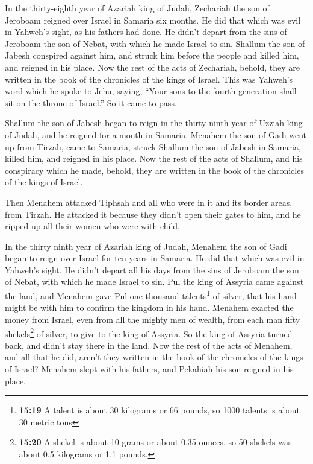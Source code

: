  In the thirty-eighth year of Azariah king of Judah,
Zechariah the son of Jeroboam reigned over Israel in Samaria six months.
 He did that which was evil in Yahweh's sight, as his
fathers had done. He didn't depart from the sins of Jeroboam the son of
Nebat, with which he made Israel to sin.  Shallum the son
of Jabesh conspired against him, and struck him before the people and
killed him, and reigned in his place.  Now the rest of
the acts of Zechariah, behold, they are written in the book of the
chronicles of the kings of Israel.  This was Yahweh's
word which he spoke to Jehu, saying, ``Your sons to the fourth
generation shall sit on the throne of Israel.'' So it came to pass.

 Shallum the son of Jabesh began to reign in the
thirty-ninth year of Uzziah king of Judah, and he reigned for a month in
Samaria.  Menahem the son of Gadi went up from Tirzah,
came to Samaria, struck Shallum the son of Jabesh in Samaria, killed
him, and reigned in his place.  Now the rest of the acts
of Shallum, and his conspiracy which he made, behold, they are written
in the book of the chronicles of the kings of Israel.

 Then Menahem attacked Tiphsah and all who were in it and
its border areas, from Tirzah. He attacked it because they didn't open
their gates to him, and he ripped up all their women who were with
child.

 In the thirty ninth year of Azariah king of Judah,
Menahem the son of Gadi began to reign over Israel for ten years in
Samaria.  He did that which was evil in Yahweh's sight.
He didn't depart all his days from the sins of Jeroboam the son of
Nebat, with which he made Israel to sin.  Pul the king of
Assyria came against the land, and Menahem gave Pul one thousand
talents\footnote{\textbf{15:19} A talent is about 30 kilograms or 66
  pounds, so 1000 talents is about 30 metric tons} of silver, that his
hand might be with him to confirm the kingdom in his hand.
 Menahem exacted the money from Israel, even from all the
mighty men of wealth, from each man fifty shekels\footnote{\textbf{15:20}
  A shekel is about 10 grams or about 0.35 ounces, so 50 shekels was
  about 0.5 kilograms or 1.1 pounds.} of silver, to give to the king of
Assyria. So the king of Assyria turned back, and didn't stay there in
the land.  Now the rest of the acts of Menahem, and all
that he did, aren't they written in the book of the chronicles of the
kings of Israel?  Menahem slept with his fathers, and
Pekahiah his son reigned in his place.


